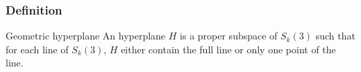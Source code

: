 
\newsavebox\truehyperplane
{}

\begin{frame}
	\frametitle{Definition}
	\begin{block}{Geometric hyperplane}
		An hyperplane $H$ is a proper subspace of $S_k(3)$ such that for each line of $S_k(3)$, $H$ either contain the full line or only one point of the line.
	\end{block}
	\centering%
\end{frame}
